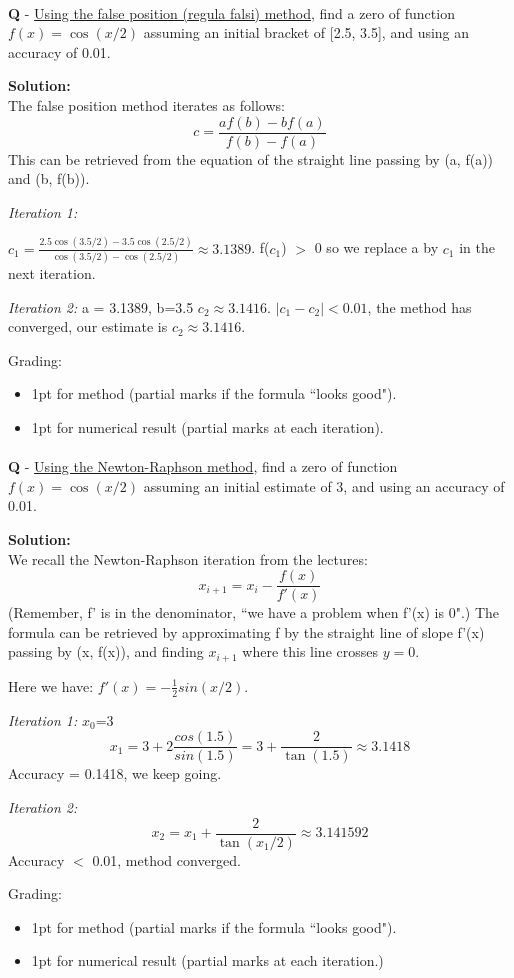 \documentclass{llncs}
\newcounter{ques}
\renewcommand{\question}[1]{\paragraph{}\textbf{Q\theques} - #1\stepcounter{ques} }
\newcommand{\answer}[1]{\color{red}\textbf{Solution:}\\#1\color{black}}
\begin{document}
\newpage
\question{\underline{Using the false position (regula falsi) method}, find a zero of function $f(x)=\cos(x/2)$ assuming an initial bracket of [2.5, 3.5],
and using an accuracy of 0.01.}

\answer{
The false position method iterates as follows:
$$
c = \frac{af(b)-bf(a)}{f(b)-f(a)}
$$
This can be retrieved from the equation of the straight line passing by (a, f(a)) and (b, f(b)).

\emph{Iteration 1:}

$c_1 = \frac{2.5\cos(3.5/2)-3.5\cos(2.5/2)}{\cos(3.5/2)-\cos(2.5/2)} \approx 3.1389$.
f($c_1$) $>$ 0 so we replace a by $c_1$ in the next iteration.

\emph{Iteration 2:} a = 3.1389, b=3.5
$c_2 \approx 3.1416$.
$|c_1 - c_2| < 0.01$, the method has converged, our estimate is $c_2 \approx 3.1416$.

Grading:
\begin{itemize}
\item 1pt for method (partial marks if the formula ``looks good").
\item 1pt for numerical result (partial marks at each iteration).
\end{itemize}
}

\newpage
\question{\underline{Using the Newton-Raphson method}, find a zero of function $f(x)=\cos(x/2)$ assuming an initial estimate of 3,
and using an accuracy of 0.01.}

\answer{We recall the Newton-Raphson iteration from the lectures:
$$
x_{i+1} = x_i - \frac{f(x)}{f'(x)}
$$
(Remember, f' is in the denominator, ``we have a problem when f'(x) is 
0".) The formula can be retrieved by approximating f by the straight 
line of slope f'(x) passing by (x, f(x)), and finding $x_{i+1}$ where 
this line crosses $y=0$.

Here we have: $f'(x) = -\frac{1}{2}sin(x/2)$.

\emph{Iteration 1:} $x_0$=3
$$
x_1 = 3 + 2\frac{cos(1.5)}{sin(1.5)} = 3 + \frac{2}{\tan(1.5)} \approx 3.1418
$$
Accuracy = 0.1418, we keep going.

\emph{Iteration 2:}
$$
x_2 = x_1 + \frac{2}{\tan(x_1/2)} \approx 3.141592
$$
Accuracy $<$ 0.01, method converged.

Grading:
\begin{itemize}
\item 1pt for method (partial marks if the formula ``looks good").
\item 1pt for numerical result (partial marks at each iteration.)
\end{itemize}
}
\end{document}
